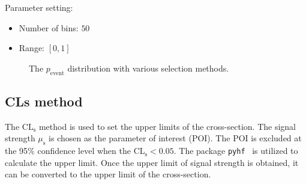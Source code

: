 \documentclass[12pt]{article}
\begin{document}
        Parameter setting:
        \begin{itemize}
            \item Number of bins: $50$
            \item Range: $[0, 1]$
        \end{itemize}

        \begin{figure}[htpb]
            \centering
            \caption{The $p_{\text{event}}$ distribution with various selection methods.}
            \label{fig:event_score_distribution}
        \end{figure}

    \subsection{CLs method}%
    \label{sub:cls_method}
        The $\text{CL}_{\text{s}}$ method is used to set the upper limits of the cross-section. The signal strength $\mu_{\text{s}}$ is chosen as the parameter of interest (POI). The POI is excluded at the 95\% confidence level when the $\text{CL}_{\text{s}} < 0.05$. The package \verb|pyhf|~\cite{pyhf,pyhf_joss} is utilized to calculate the upper limit. Once the upper limit of signal strength is obtained, it can be converted to the upper limit of the cross-section.
\end{document}
